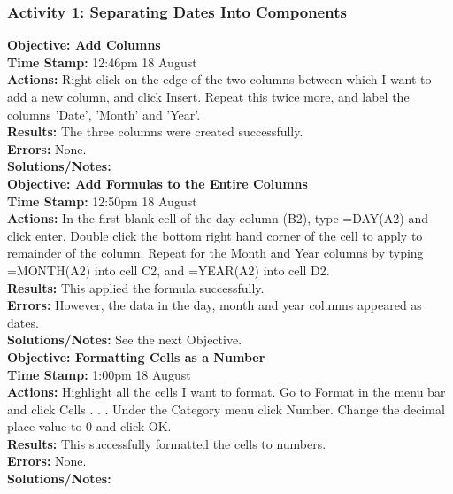 \documentclass{article}
\begin{document}
\begin{FlushLeft}
\subsubsection*{Activity 1: Separating Dates Into Components}
\textbf{Objective: Add Columns}\\
\textbf{Time Stamp:} 12:46pm 18 August \\
\textbf{Actions:} Right click on the edge of the two columns between which I want to add a new column, and click Insert. Repeat this twice more, and label the columns 'Date', 'Month' and 'Year'.\\
\textbf{Results:} The three columns were created successfully.\\
\textbf{Errors:} None. \\
\textbf{Solutions/Notes:}\\
\vspace{5mm}
\textbf{Objective: Add Formulas to the Entire Columns}\label{sec:cellformat}\\
\textbf{Time Stamp:} 12:50pm 18 August \\
\textbf{Actions:} In the first blank cell of the day column (B2), type =DAY(A2) and click enter. Double click the bottom right hand corner of the cell to apply to remainder of the column. Repeat for the Month and Year columns by typing =MONTH(A2) into cell C2, and =YEAR(A2) into cell D2.\\
\textbf{Results:} This applied the formula successfully. \\
\textbf{Errors:} However, the data in the day, month and year columns appeared as dates. \\
\textbf{Solutions/Notes:} See the next Objective.\\
\vspace{5mm}
\textbf{Objective: Formatting Cells as a Number}\\
\textbf{Time Stamp:} 1:00pm 18 August \\
\textbf{Actions:} Highlight all the cells I want to format. Go to Format in the menu bar and click Cells . . . Under the Category menu click Number. Change the decimal place value to 0 and click OK.\\
\textbf{Results:} This successfully formatted the cells to numbers.\\
\textbf{Errors:} None.\\
\textbf{Solutions/Notes:}\\


\end{FlushLeft}
\end{document}
